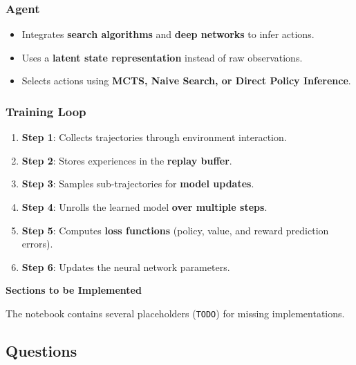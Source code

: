 \subsubsection{Agent}
\begin{itemize}
    \item Integrates \textbf{search algorithms} and \textbf{deep networks} to infer actions.
    \item Uses a \textbf{latent state representation} instead of raw observations.
    \item Selects actions using \textbf{MCTS, Naive Search, or Direct Policy Inference}.
\end{itemize}

\subsubsection{Training Loop}
\begin{enumerate}
    \item \textbf{Step 1}: Collects trajectories through environment interaction.
    \item \textbf{Step 2}: Stores experiences in the \textbf{replay buffer}.
    \item \textbf{Step 3}: Samples sub-trajectories for \textbf{model updates}.
    \item \textbf{Step 4}: Unrolls the learned model \textbf{over multiple steps}.
    \item \textbf{Step 5}: Computes \textbf{loss functions} (policy, value, and reward prediction errors).
    \item \textbf{Step 6}: Updates the neural network parameters.
\end{enumerate}

\textbf{Sections to be Implemented}

The notebook contains several placeholders (\texttt{TODO}) for missing implementations.
\subsection{Questions}

